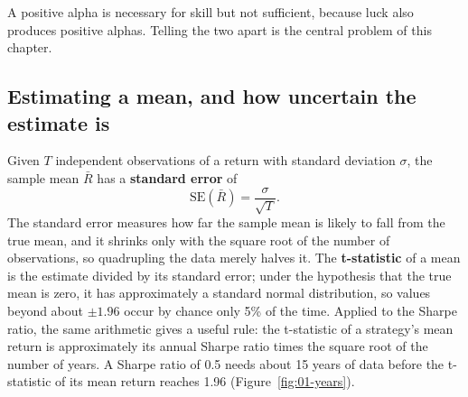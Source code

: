A positive alpha is necessary for skill but not sufficient, because luck also produces positive alphas. Telling the two apart is the central problem of this chapter.

\subsection{Estimating a mean, and how uncertain the estimate is}
\label{sec:01-se}

Given $T$ independent observations of a return with standard deviation $\sigma$, the sample mean $\bar{R}$ has a \textbf{standard error} of
\begin{equation}
  \mathrm{SE}(\bar{R}) = \frac{\sigma}{\sqrt{T}}.
  \label{eq:01-se}
\end{equation}
The standard error measures how far the sample mean is likely to fall from the true mean, and it shrinks only with the square root of the number of observations, so quadrupling the data merely halves it. The \textbf{t-statistic} of a mean is the estimate divided by its standard error; under the hypothesis that the true mean is zero, it has approximately a standard normal distribution, so values beyond about $\pm 1.96$ occur by chance only 5\% of the time. Applied to the Sharpe ratio, the same arithmetic gives a useful rule: the t-statistic of a strategy's mean return is approximately its annual Sharpe ratio times the square root of the number of years. A Sharpe ratio of 0.5
needs about 15 years of data before the t-statistic of its mean return reaches 1.96 (Figure~\ref{fig:01-years}).




